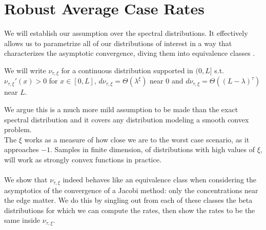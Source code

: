 \documentclass{article}
\begin{document}
\section{Robust Average Case Rates}
We will establish our assumption over the spectral distributions. It effectively allows us to parametrize all of our distributions of interest in a way that characterizes the asymptotic convergence, diving them into equivalence classes .

\begin{assumption}
We will write $\nu_{\tau,\xi}$ for a continuous distribution supported in $(0,L]$ s.t. $\nu_{\tau,\xi}'(x)>0$ for $x\in [0,L]$, $d\nu_{\tau,\xi}=\Theta( \lambda^\xi)$ near $0$ and $d\nu_{\tau,\xi}=\Theta( (L-\lambda)^\tau)$ near $L$. 
\label{assumption}
\end{assumption}

We argue this is a much more mild assumption to be made than the exact spectral distribution and it covers any distribution modeling a smooth convex problem. \\
The $\xi$ works as a measure of how close we are to the worst case scenario, as it approaches $-1$. Samples in finite dimension, of distributions with high values of $\xi$, will work as strongly convex functions in practice.
\paragraph{}
We show that $\nu_{\tau,\xi}$ indeed behaves like an equivalence class when considering the asymptotics of the convergence of a Jacobi method: only the concentrations near the edge matter. We do this by singling out from each of these classes the beta distributions for which we can compute the rates, then show the rates to be the same inside $\nu_{\tau,\xi}$.\\ 
\end{document}
